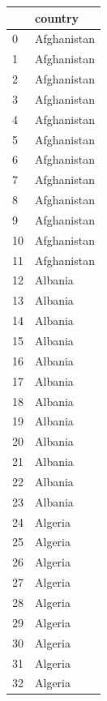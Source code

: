 \documentclass[
  letterpaper,
  DIV=11,
  numbers=noendperiod]{scrreprt}
\begin{document}
\begin{tabular}{ll}
\toprule
{} &                   country \\
\midrule
0    &               Afghanistan \\
1    &               Afghanistan \\
2    &               Afghanistan \\
3    &               Afghanistan \\
4    &               Afghanistan \\
5    &               Afghanistan \\
6    &               Afghanistan \\
7    &               Afghanistan \\
8    &               Afghanistan \\
9    &               Afghanistan \\
10   &               Afghanistan \\
11   &               Afghanistan \\
12   &                   Albania \\
13   &                   Albania \\
14   &                   Albania \\
15   &                   Albania \\
16   &                   Albania \\
17   &                   Albania \\
18   &                   Albania \\
19   &                   Albania \\
20   &                   Albania \\
21   &                   Albania \\
22   &                   Albania \\
23   &                   Albania \\
24   &                   Algeria \\
25   &                   Algeria \\
26   &                   Algeria \\
27   &                   Algeria \\
28   &                   Algeria \\
29   &                   Algeria \\
30   &                   Algeria \\
31   &                   Algeria \\
32   &                   Algeria \\

\end{tabular}
\end{document}
